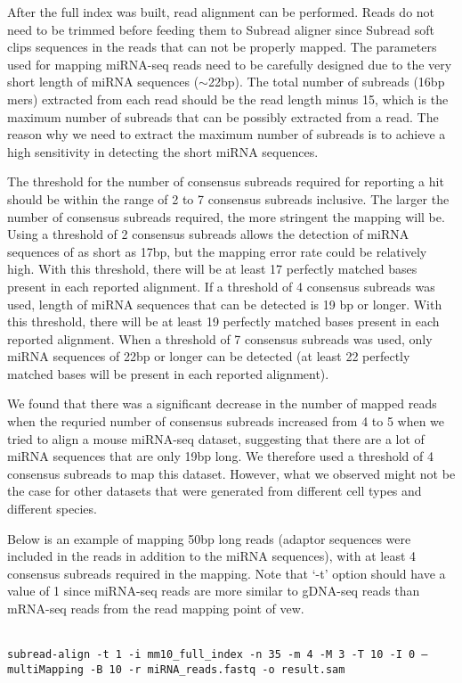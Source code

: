 \documentclass[12pt]{report}
\newcommand{\code}[1]{{\small\texttt{#1}}}
\newcommand{\Subread}{\textsf{Subread}}
\begin{document}
After the full index was built, read alignment can be performed.
Reads do not need to be trimmed before feeding them to {\Subread} aligner since {\Subread} soft clips sequences in the reads that can not be properly mapped.
The parameters used for mapping miRNA-seq reads need to be carefully designed due to the very short length of miRNA sequences ($\sim$22bp).
The total number of subreads (16bp mers) extracted from each read should be the read length minus 15, which
is the maximum number of subreads that can be possibly extracted from a read.
The reason why we need to extract the maximum number of subreads is to achieve a high sensitivity in detecting the short miRNA sequences.

The threshold for the number of consensus subreads required for reporting a hit should be within the range of 2 to 7 consensus subreads inclusive.
The larger the number of consensus subreads required, the more stringent the mapping will be.
Using a threshold of 2 consensus subreads allows the detection of miRNA sequences of as short as 17bp, but the mapping error rate could be relatively high.
With this threshold, there will be at least 17 perfectly matched bases present in each reported alignment.
If a threshold of 4 consensus subreads was used, length of miRNA sequences that can be detected is 19 bp or longer.
With this threshold, there will be at least 19 perfectly matched bases present in each reported alignment.
When a threshold of 7 consensus subreads was used, only miRNA sequences of 22bp or longer can be detected (at least 22 perfectly matched bases will be present in each reported alignment).

We found that there was a significant decrease in the number of mapped reads when the requried number of consensus subreads increased from 4 to 5 when we tried to align a mouse miRNA-seq dataset, suggesting that there are a lot of miRNA sequences that are only 19bp long.
We therefore used a threshold of 4 consensus subreads to map this dataset.
However, what we observed might not be the case for other datasets that were generated from different cell types and different species.

Below is an example of mapping 50bp long reads (adaptor sequences were included in the reads in addition to the miRNA sequences), with at least 4 consensus subreads required in the mapping.
Note that `-t' option should have a value of 1 since miRNA-seq reads are more similar to gDNA-seq reads than mRNA-seq reads from the read mapping point of vew.

\code{\\
subread-align -t 1 -i mm10\_full\_index -n 35 -m 4 -M 3 -T 10 -I 0
--multiMapping -B 10 -r miRNA\_reads.fastq -o result.sam\\
}
\end{document}
